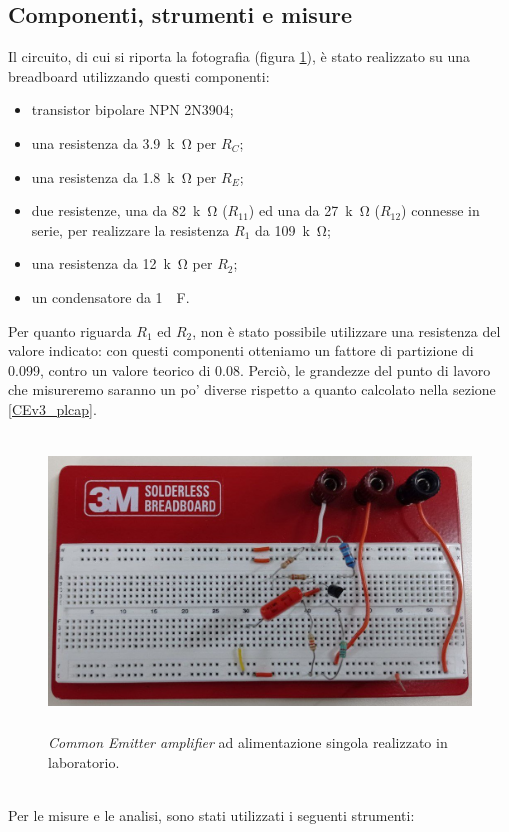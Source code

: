 \documentclass{report}
\begin{document}
\subsection{Componenti, strumenti e misure} \label{CEv3_miscap}
Il circuito, di cui si riporta la fotografia (figura \ref{figura:fotoCEv3}), è stato realizzato su una breadboard utilizzando questi componenti:
\begin{itemize}
\item transistor bipolare NPN 2N3904;
\item una resistenza da \SI{3.9}{k\ohm} per $R_C$;
\item una resistenza da \SI{1.8}{k\ohm} per $R_E$;
\item due resistenze, una da \SI{82}{k\ohm} ($R_{11}$) ed una da \SI{27}{k\ohm} ($R_{12}$) connesse in serie, per realizzare la resistenza $R_1$ da \SI{109}{k\ohm};
\item una resistenza da \SI{12}{k\ohm} per $R_2$;
\item un condensatore da \SI{1}{\mu\farad}.
\end{itemize}
Per quanto riguarda $R_1$ ed $R_2$, non è stato possibile utilizzare una resistenza del valore indicato: con questi componenti otteniamo un fattore di partizione di 0.099, contro un valore teorico di 0.08. Perciò, le grandezze del punto di lavoro che misureremo saranno un po' diverse rispetto a quanto calcolato nella sezione \ref{CEv3_plcap}.
\begin{figure}[h]
\centering
\includegraphics[height=7.8cm]{immagini/fotoCEv3}
\caption{\textit{Common Emitter amplifier} ad alimentazione singola realizzato in laboratorio.}
\label{figura:fotoCEv3}
\end{figure}
\\Per le misure e le analisi, sono stati utilizzati i seguenti strumenti:
\end{document}
